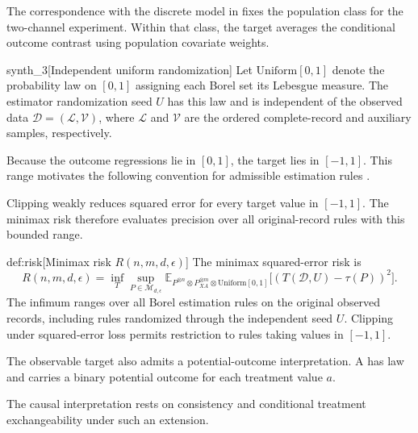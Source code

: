 The correspondence with the discrete model in \citet[model (3)]{ZengBalakrishnanHanKennedy2026Discrete} fixes the population class for the two-channel experiment. Within that class, the target  averages the conditional outcome contrast using population covariate weights.

\begin{definitionv}{synth_3}[Independent uniform randomization]
Let \(\mathrm{Uniform}[0,1]\) denote the probability law on \([0,1]\) assigning each Borel set its Lebesgue measure. The estimator randomization seed \(U\) has this law and is independent of the observed data \(\mathcal D=(\mathcal L,\mathcal V)\), where \(\mathcal L\) and \(\mathcal V\) are the ordered complete-record and auxiliary samples, respectively.
\end{definitionv}

Because the outcome regressions lie in \([0,1]\), the target lies in \([-1,1]\). This range motivates the following convention for admissible estimation rules .



Clipping weakly reduces squared error for every target value in \([-1,1]\). The minimax risk  therefore evaluates precision over all original-record rules with this bounded range.

\begin{definitionv}{def:risk}[Minimax risk $R(n,m,d,\epsilon)$]
The minimax squared-error risk is
\[
R(n,m,d,\epsilon)
=
\inf_T\sup_{P\in\mathcal M_{d,\epsilon}}
\mathbb E_{P^{\otimes n}\otimes P_{XA}^{\otimes m}\otimes\mathrm{Uniform}[0,1]}
\bigl[(T(\mathcal D,U)-\tau(P))^2\bigr].
\]
The infimum ranges over all Borel estimation rules on the original observed records, including rules randomized through the independent seed \(U\). Clipping under squared-error loss permits restriction to rules taking values in \([-1,1]\).
\end{definitionv}

The observable target also admits a potential-outcome interpretation. A  has law  and carries a binary potential outcome  for each treatment value \(a\).



The causal interpretation rests on consistency and conditional treatment exchangeability under such an extension.


